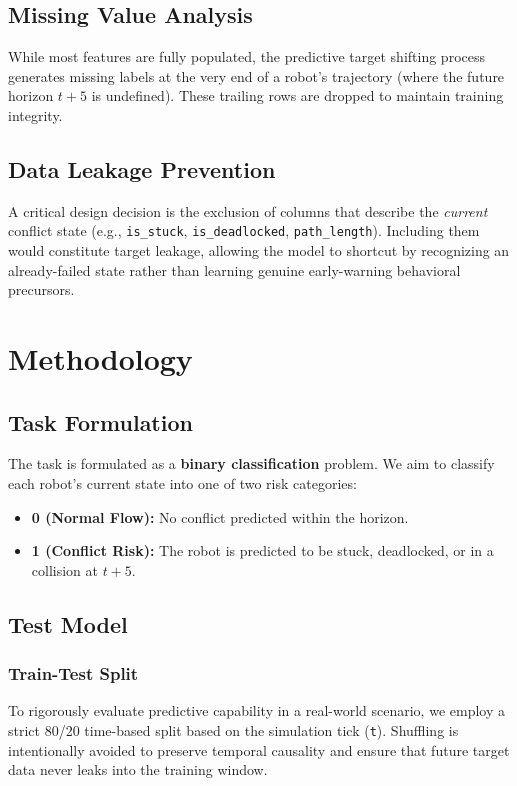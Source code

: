 \documentclass[12pt]{article}
\begin{document}
\subsection{Missing Value Analysis}
While most features are fully populated, the predictive target shifting process generates missing labels at the very end of a robot's trajectory (where the future horizon $t+5$ is undefined). These trailing rows are dropped to maintain training integrity.

\subsection{Data Leakage Prevention}
A critical design decision is the exclusion of columns that describe the \textit{current} conflict state (e.g., \texttt{is\_stuck}, \texttt{is\_deadlocked}, \texttt{path\_length}). Including them would constitute target leakage, allowing the model to shortcut by recognizing an already-failed state rather than learning genuine early-warning behavioral precursors.

\section{Methodology}

\subsection{Task Formulation}
The task is formulated as a \textbf{binary classification} problem. We aim to classify each robot's current state into one of two risk categories:
\begin{itemize}
    \item \textbf{0 (Normal Flow):} No conflict predicted within the horizon.
    \item \textbf{1 (Conflict Risk):} The robot is predicted to be stuck, deadlocked, or in a collision at $t+5$.
\end{itemize}

\subsection{Test Model}

\subsubsection{Train-Test Split}
To rigorously evaluate predictive capability in a real-world scenario, we employ a strict 80/20 time-based split based on the simulation tick (\texttt{t}). Shuffling is intentionally avoided to preserve temporal causality and ensure that future target data never leaks into the training window.
\end{document}
